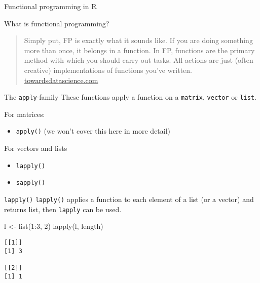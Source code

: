 \documentclass[ignorenonframetext,,t]{beamer}
\providecommand{\tightlist}{%
\setlength{\itemsep}{0pt}\setlength{\parskip}{0pt}}
\newenvironment{Shaded}{\begin{snugshade}}{\end{snugshade}}
\newcommand{\DecValTok}[1]{\textcolor[rgb]{0.00,0.00,0.81}{#1}}
\newcommand{\FunctionTok}[1]{\textcolor[rgb]{0.00,0.00,0.00}{#1}}
\newcommand{\NormalTok}[1]{#1}
\newcommand{\OtherTok}[1]{\textcolor[rgb]{0.56,0.35,0.01}{#1}}
\newcommand{\SpecialCharTok}[1]{\textcolor[rgb]{0.00,0.00,0.00}{#1}}
\providecommand{\tightlist}{%
\setlength{\itemsep}{0pt}\setlength{\parskip}{0pt}}
\renewcommand{\tightlist}{\setlength{\itemsep}{1.4ex}\setlength{\parskip}{0pt}}
\begin{document}
\begin{frame}{Functional programming in R}
\protect\hypertarget{functional-programming-in-r}{}
\begin{block}{What is functional programming?}
\protect\hypertarget{what-is-functional-programming}{}
\begin{quote}
Simply put, FP is exactly what it sounds like. If you are doing
something more than once, it belongs in a function. In FP, functions are
the primary method with which you should carry out tasks. All actions
are just (often creative) implementations of functions you've written.
\href{https://towardsdatascience.com/cleaner-r-code-with-functional-programming-adc37931ef7a}{towardsdatascience.com}
\end{quote}
\end{block}
\end{frame}

\begin{frame}[fragile]
\begin{block}{The \texttt{apply}-family}
\protect\hypertarget{the-apply-family}{}
These functions apply a function on a \texttt{matrix}, \texttt{vector}
or \texttt{list}.

For matrices:

\begin{itemize}
\tightlist
\item
  \texttt{apply()} (we won't cover this here in more detail)
\end{itemize}

For vectors and lists

\begin{itemize}
\tightlist
\item
  \texttt{lapply()}
\item
  \texttt{sapply()}
\end{itemize}
\end{block}
\end{frame}

\begin{frame}[fragile]
\begin{block}{\texttt{lapply()}}
\protect\hypertarget{lapply}{}
\texttt{lapply()} applies a function to each element of a list (or a
vector) and returns list, then \texttt{lapply} can be used.

\begin{Shaded}
\begin{Highlighting}[]
\NormalTok{l }\OtherTok{\textless{}{-}} \FunctionTok{list}\NormalTok{(}\DecValTok{1}\SpecialCharTok{:}\DecValTok{3}\NormalTok{, }\DecValTok{2}\NormalTok{)}
\FunctionTok{lapply}\NormalTok{(l, length)}
\end{Highlighting}
\end{Shaded}

\begin{verbatim}
[[1]]
[1] 3

[[2]]
[1] 1
\end{verbatim}
\end{block}
\end{frame}
\end{document}
